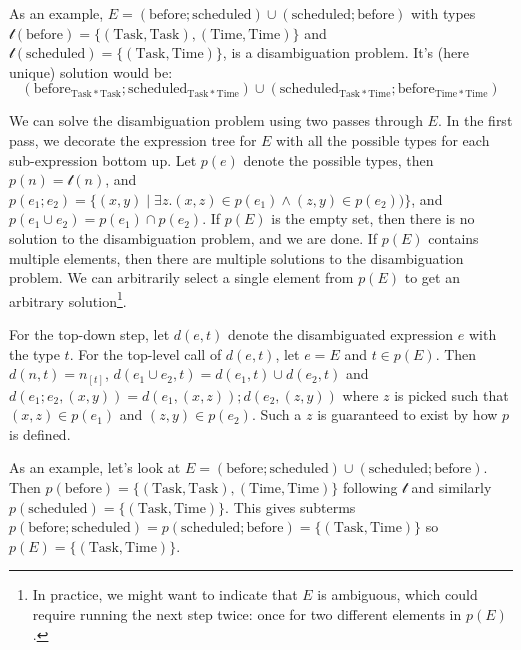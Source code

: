 \documentclass[12pt]{article}
\begin{document}
As an example, $E = (\mathrm{before};\mathrm{scheduled}) \cup (\mathrm{scheduled};\mathrm{before})$ with types $\mathcal{t}(\mathrm{before}) = \{(\mathrm{Task}, \mathrm{Task}),(\mathrm{Time}, \mathrm{Time})\}$ and $\mathcal{t}(\mathrm{scheduled}) = \{(\mathrm{Task}, \mathrm{Time})\}$, is a disambiguation problem.
It's (here unique) solution would be:
\[\left(\mathrm{before}_{\mathrm{Task * Task}};\mathrm{scheduled}_{\mathrm{Task * Time}}\right) \cup \left(\mathrm{scheduled}_{\mathrm{Task * Time}};\mathrm{before}_{\mathrm{Time * Time}}\right)\]

We can solve the disambiguation problem using two passes through $E$.
In the first pass, we decorate the expression tree for $E$ with all the possible types for each sub-expression bottom up.
Let $p(e)$ denote the possible types, then $p(n) = \mathcal{t}(n)$, and $p(e_1;e_2) = \{(x,y) \mid \exists z. (x,z) \in p(e_1) \wedge (z,y) \in p(e_2))\}$, and $p(e_1 \cup e_2) = p(e_1) \cap p(e_2)$.
If $p(E)$ is the empty set, then there is no solution to the disambiguation problem, and we are done.
If $p(E)$ contains multiple elements, then there are multiple solutions to the disambiguation problem.
We can arbitrarily select a single element from $p(E)$ to get an arbitrary solution\footnote{In practice, we might want to indicate that $E$ is ambiguous, which could require running the next step twice: once for two different elements in $p(E)$.}.

For the top-down step, let $d(e,t)$ denote the disambiguated expression $e$ with the type $t$.
For the top-level call of $d(e,t)$, let $e=E$ and $t\in p(E)$.
Then $d(n,t) = n_{[t]}$, $d(e_1 \cup e_2, t) = d(e_1,t) \cup d(e_2,t)$ and $d(e_1 ; e_2, (x,y)) = d(e_1, (x,z)) ; d(e_2, (z,y))$ where $z$ is picked such that $(x,z)\in p(e_1)$ and $(z,y)\in p(e_2)$.
Such a $z$ is guaranteed to exist by how $p$ is defined.

As an example, let's look at $E = (\mathrm{before};\mathrm{scheduled}) \cup (\mathrm{scheduled};\mathrm{before})$.
Then $p(\mathrm{before}) =  \{(\mathrm{Task}, \mathrm{Task}),(\mathrm{Time}, \mathrm{Time})\}$ following $\mathcal{t}$ and similarly $p(\mathrm{scheduled}) = \{(\mathrm{Task}, \mathrm{Time})\}$.
This gives subterms $p(\mathrm{before};\mathrm{scheduled}) = p(\mathrm{scheduled};\mathrm{before}) = \{(\mathrm{Task}, \mathrm{Time})\}$ so $p(E) = \{(\mathrm{Task}, \mathrm{Time})\}$.
\end{document}
